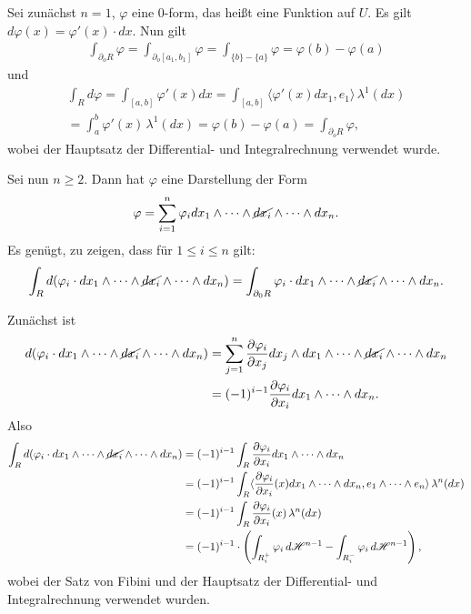 \documentclass[a4paper,twoside,DIV15,BCOR12mm]{scrbook}
\newcommand{\HM}{\mathscr H}
\begin{document}
\begin{beweis}
Sei zunächst $n=1$, $\varphi$ eine 0-form, das heißt eine Funktion auf $U$. Es gilt $d\varphi(x) = \varphi'(x)\cdot dx$. Nun gilt
\begin{align*}
\int_{\partial_o R}\varphi = \int_{\partial_o [a_1,b_1]}\varphi = 
\int_{\{b\}-\{a\}} \varphi = \varphi(b)-\varphi(a)
\end{align*}
und
\begin{multline*}
\int_R d\varphi = \int_{[a,b]} \varphi'(x)dx = \int_{[a,b]}\langle \varphi'(x)dx_1, e_1\rangle \, \lambda^1(dx) \\
= \int_a^b \varphi'(x) \,\lambda^1(dx) = \varphi(b)-\varphi(a) = \int_{\partial_oR}\varphi,
\end{multline*}
wobei der Hauptsatz der Differential- und Integralrechnung verwendet wurde. 

Sei nun $n\ge 2$. Dann hat $\varphi$ eine Darstellung der Form
\[
\varphi = \sum_{i=1}^n \varphi_i dx_1\wedge \dots \wedge \cancel{dx_i}\wedge \dots\wedge dx_n.
\]
Es genügt, zu zeigen, dass für $1\le i \le n$ gilt:
\[
\int_R d(\varphi_i \cdot dx_1\wedge \dots \wedge \cancel{dx_i} \wedge \dots\wedge dx_n) = 
\int_{\partial_0 R} \varphi_i \cdot dx_1\wedge \dots \wedge \cancel{dx_i} \wedge \dots\wedge dx_n.
\]

Zunächst ist 
\begin{align*}
d(\varphi_i \cdot dx_1\wedge \dots \wedge \cancel{dx_i} \wedge \dots\wedge dx_n)
&= \sum_{j=1}^n \frac{\partial \varphi_i}{\partial x_j} dx_j \wedge dx_1\wedge \dots \wedge \cancel{dx_i} \wedge \dots\wedge dx_n \\
&= (-1)^{i-1} \frac{\partial \varphi_i}{\partial x_i} dx_1\wedge \dots\wedge dx_n.
\end{align*}
Also
\begin{align*}
\int_R d(\varphi_i \cdot dx_1\wedge \dots \wedge \cancel{dx_i} \wedge \dots\wedge dx_n)
&= (-1)^{i-1} \int_R \frac{\partial \varphi_i}{\partial x_i} dx_1\wedge \dots\wedge dx_n \\
&= (-1)^{i-1} \int_R \langle \frac{\partial \varphi_i}{\partial x_i}(x) dx_1\wedge \dots\wedge dx_n, e_1\wedge\dots\wedge e_n\rangle \, \lambda^n(dx) \\
&= (-1)^{i-1} \int_R \frac{\partial \varphi_i}{\partial x_i}(x)\, \lambda^n(dx) \\
&= (-1)^{i-1} \cdot \left(\int_{R_i^+} \varphi_i\, d\HM^{n-1} - \int_{R_i^-} \varphi_i\, d\HM^{n-1}\right),
\end{align*}
wobei der Satz von Fibini und der Hauptsatz der Differential- und Integralrechnung verwendet wurden. 


\end{beweis}
\end{document}
